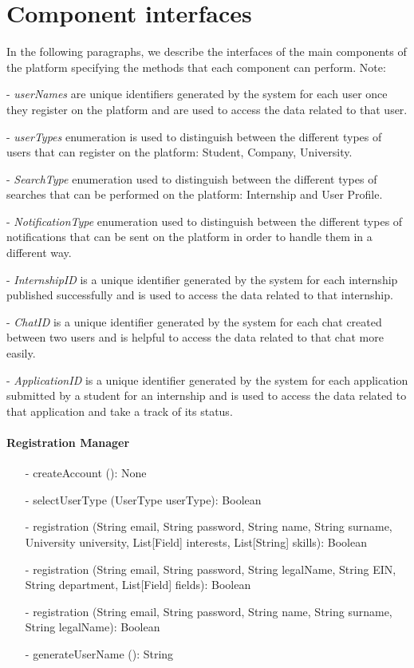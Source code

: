 \section{Component interfaces}\label{sec:component interfaces}
In the following paragraphs, we describe the interfaces of the main components of the platform specifying the methods that each component can perform.
Note: 

- \textit{userNames} are unique identifiers generated by the system for each user once they register on the platform and are used to access the data related to that user.

- \textit{userTypes} enumeration is used to distinguish between the different types of users that can register on the platform: Student, Company, University.

- \textit{SearchType} enumeration used to distinguish between the different types of searches that can be performed on the platform: Internship and User Profile.

- \textit{NotificationType} enumeration used to distinguish between the different types of notifications that can be sent on the platform in order to handle them in a different way.

- \textit{InternshipID} is a unique identifier generated by the system for each internship published successfully and is used to access the data related to that internship.

- \textit{ChatID} is a unique identifier generated by the system for each chat created between two users and is helpful to access the data related to that chat more easily.

- \textit{ApplicationID} is a unique identifier generated by the system for each application submitted by a student for an internship and is used to access the data related to that application and take a track of its status.
\paragraph{Registration Manager}
\begin{itemize}
    \item[-] createAccount (): None
    \item[-] selectUserType (UserType userType): Boolean
    \item[-] registration (String email, String password, String name, String surname, University university, List[Field] interests, List[String] skills): Boolean
    \item[-] registration (String email, String password, String legalName, String EIN, String department, List[Field] fields): Boolean
    \item[-] registration (String email, String password, String name, String surname, String legalName): Boolean
    \item[-] generateUserName (): String
\end{itemize}


